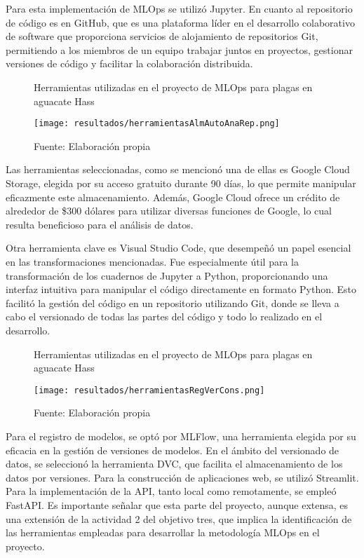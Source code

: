 \newpage

Para esta implementación de MLOps se utilizó Jupyter. En cuanto al repositorio de código es en GitHub, que es una plataforma líder en el desarrollo colaborativo de software que proporciona servicios de alojamiento de repositorios Git, permitiendo a los miembros de un equipo trabajar juntos en proyectos, gestionar versiones de código y facilitar la colaboración distribuida.

\newpage

\begin{figure}[h]
\centering
\caption{Herramientas utilizadas en el proyecto de MLOps para plagas en aguacate Hass}
\texttt{[image: resultados/herramientasAlmAutoAnaRep.png]}
\caption*{\footnotesize Fuente: Elaboración propia}
\label{fig:figuraHerramientasAlmAutoAnaRep}
\end{figure}

Las herramientas seleccionadas, como se mencionó una de ellas es Google Cloud Storage, elegida por su acceso gratuito durante 90 días, lo que permite manipular eficazmente este almacenamiento. Además, Google Cloud ofrece un crédito de alrededor de \$300 dólares para utilizar diversas funciones de Google, lo cual resulta beneficioso para el análisis de datos.

Otra herramienta clave es Visual Studio Code, que desempeñó un papel esencial en las transformaciones mencionadas. Fue especialmente útil para la transformación de los cuadernos de Jupyter a Python, proporcionando una interfaz intuitiva para manipular el código directamente en formato Python. Esto facilitó la gestión del código en un repositorio utilizando Git, donde se lleva a cabo el versionado de todas las partes del código y todo lo realizado en el desarrollo.

\begin{figure}[h]
\centering
\caption{Herramientas utilizadas en el proyecto de MLOps para plagas en aguacate Hass}
\texttt{[image: resultados/herramientasRegVerCons.png]}
\caption*{\footnotesize Fuente: Elaboración propia}
\label{fig:figuraHerramientasRegVerCons}
\end{figure}

\newpage

Para el registro de modelos, se optó por MLFlow, una herramienta elegida por su eficacia en la gestión de versiones de modelos. En el ámbito del versionado de datos, se seleccionó la herramienta DVC, que facilita el almacenamiento de los datos por versiones. Para la construcción de aplicaciones web, se utilizó Streamlit. Para la implementación de la API, tanto local como remotamente, se empleó FastAPI. Es importante señalar que esta parte del proyecto, aunque extensa, es una extensión de la actividad 2 del objetivo tres, que implica la identificación de las herramientas empleadas para desarrollar la metodología MLOps en el proyecto.

